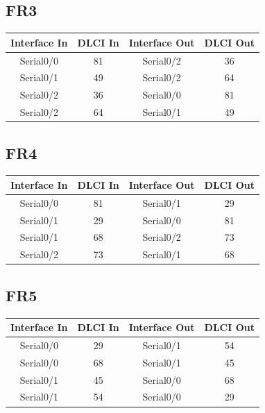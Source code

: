 \documentclass[12pt, a4paper, spanish]{article}
\begin{document}
\subsection{FR3}
\begin{center}
\begin{tabular}{|c|c|c|c|}
\hline
Interface In & DLCI In & Interface Out & DLCI Out \\
\hline
\hline
Serial0/0 & 81 & Serial0/2 & 36 \\
\hline
Serial0/1 & 49 & Serial0/2 & 64 \\
\hline
Serial0/2 & 36 & Serial0/0 & 81 \\
\hline
Serial0/2 & 64 & Serial0/1 & 49 \\
\hline
\end{tabular}
\end{center}

\subsection{FR4}
\begin{center}
\begin{tabular}{|c|c|c|c|}
\hline
Interface In & DLCI In & Interface Out & DLCI Out \\
\hline
\hline
Serial0/0 & 81 & Serial0/1 & 29 \\
\hline
Serial0/1 & 29 & Serial0/0 & 81 \\
\hline
Serial0/1 & 68 & Serial0/2 & 73 \\
\hline
Serial0/2 & 73 & Serial0/1 & 68 \\
\hline
\end{tabular}
\end{center}

\subsection{FR5}
\begin{center}
\begin{tabular}{|c|c|c|c|}
\hline
Interface In & DLCI In & Interface Out & DLCI Out \\
\hline
\hline
Serial0/0 & 29 & Serial0/1 & 54 \\
\hline
Serial0/0 & 68 & Serial0/1 & 45 \\
\hline
Serial0/1 & 45 & Serial0/0 & 68 \\
\hline
Serial0/1 & 54 & Serial0/0 & 29 \\
\hline
\end{tabular}
\end{center}
\end{document}
